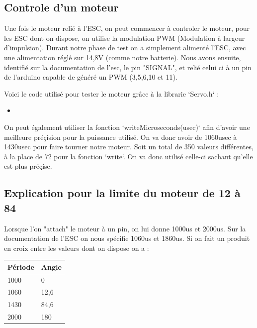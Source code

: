 \documentclass[10pt,a4paper]{article}
\newcommand{\insertcode}[2]{\begin{itemize}\item[]\end{itemize}}
\begin{document}
\subsection{Controle d'un moteur}
Une fois le moteur relié à l'ESC, on peut commencer à controler le moteur, pour les ESC dont on dispose, on utilise la modulation PWM (Modulation à largeur d'impulsion). Durant notre phase de test on a simplement alimenté l'ESC, avec une alimentation réglé sur 14,8V (comme notre batterie). Nous avons ensuite, identifié sur la documentation de l'esc, le pin "SIGNAL", et relié celui ci à un pin de l'arduino capable de généré un PWM (3,5,6,10 et 11). 

Voici le code utilisé pour tester le moteur grâce à la librarie `Servo.h` :
\insertcode{code/1.ino}{Code basique pour controller des moteurs}

 On peut également utiliser la fonction `writeMicroseconds(usec)` afin d'avoir une meilleure préçision pour la puissance utilisé. On va donc avoir de 1060usec à 1430usec pour faire tourner notre moteur. Soit un total de 350 valeurs différentes, à la place de 72 pour la fonction `write`. On va donc utilisé celle-ci sachant qu'elle est plus préçise.

\subsection*{Explication pour la limite du moteur de 12 à 84}
Lorsque l'on "attach" le moteur à un pin, on lui donne 1000us et 2000us. Sur la documentation de l'ESC on nous spécifie 1060us et 1860us. Si on fait un produit en croix entre les valeurs dont on dispose on a :\\

\begin{tabular}{|l|l|}
    Période  & Angle  \tabularnewline    \hline
    1000  & 0  \tabularnewline    \hline
    1060  & 12,6 \tabularnewline    \hline
    1430  & 84,6  \tabularnewline    \hline
    2000  & 180  \tabularnewline    \hline
    
   
        
 \end{tabular}
\end{document}
